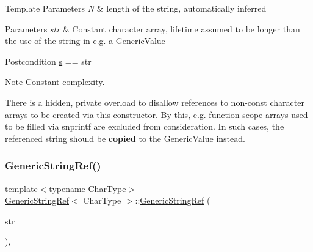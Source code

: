 \begin{DoxyTemplParams}{Template Parameters}
{\em N} & length of the string, automatically inferred\\
\hline
\end{DoxyTemplParams}

\begin{DoxyParams}{Parameters}
{\em str} & Constant character array, lifetime assumed to be longer than the use of the string in e.\+g. a \hyperlink{classGenericValue}{Generic\+Value}\\
\hline
\end{DoxyParams}
\begin{DoxyPostcond}{Postcondition}
\hyperlink{structGenericStringRef_ac555994afd329bc9bc1780acf2f9d9be}{s} == str
\end{DoxyPostcond}
\begin{DoxyNote}{Note}
Constant complexity. 

There is a hidden, private overload to disallow references to non-\/const character arrays to be created via this constructor. By this, e.\+g. function-\/scope arrays used to be filled via {\ttfamily snprintf} are excluded from consideration. In such cases, the referenced string should be {\bfseries copied} to the \hyperlink{classGenericValue}{Generic\+Value} instead. 
\end{DoxyNote}
\mbox{\label{structGenericStringRef_a9e80d81d5ad49cf0fb4128ace8c548d9}} 
\subsubsection{\texorpdfstring{Generic\+String\+Ref()}{GenericStringRef()}\hspace{0.1cm}{\footnotesize\ttfamily [2/5]}}
{\footnotesize\ttfamily template$<$typename Char\+Type$>$ \\
\hyperlink{structGenericStringRef}{Generic\+String\+Ref}$<$ Char\+Type $>$\+::\hyperlink{structGenericStringRef}{Generic\+String\+Ref} (\begin{DoxyParamCaption}\item[{const Char\+Type $\ast$}]{str }\end{DoxyParamCaption})\hspace{0.3cm}{\ttfamily [inline]}, {\ttfamily [explicit]}}



